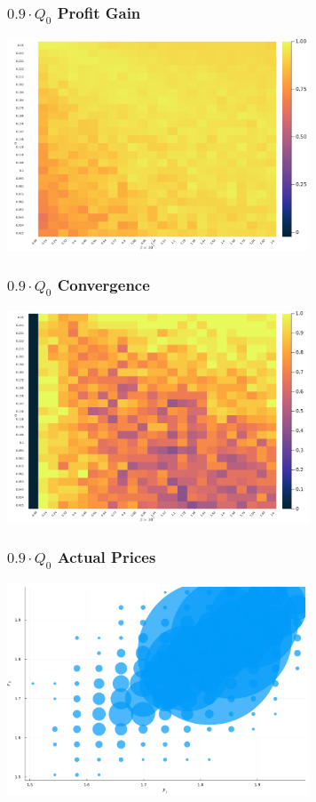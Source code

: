 \documentclass{beamer}
\begin{document}
	\begin{frame}\frametitle{$0.9 \cdot Q_0$ Profit Gain}
\begin{center}
	\includegraphics[width=9cm]{heatmap_profit_gain_small_0.9.png}
\end{center}
\end{frame}
\begin{frame}\frametitle{$0.9 \cdot Q_0$ Convergence}
\begin{center}
	\includegraphics[width=9cm]{heatmap_convergence_counts_small_0.9.png}
\end{center}
\end{frame}
\begin{frame}\frametitle{$0.9 \cdot Q_0$ Actual Prices}
\begin{center}
	\includegraphics[width=9cm]{scatter_plot_prices_small_0.9.png}
\end{center}
\end{frame}







	
\end{document}
